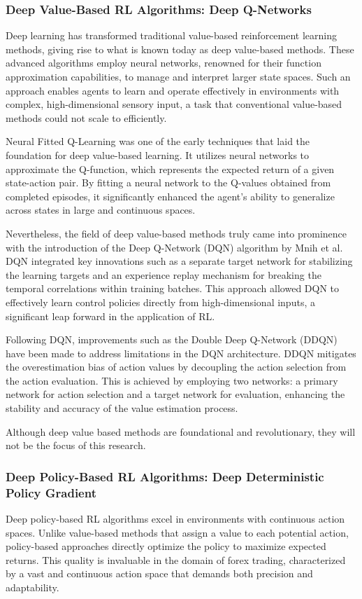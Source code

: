 \subsubsection{Deep Value-Based RL Algorithms: Deep Q-Networks}
Deep learning has transformed traditional value-based reinforcement learning methods, giving rise to what is known today as deep value-based methods. These advanced algorithms employ neural networks, renowned for their function approximation capabilities, to manage and interpret larger state spaces. Such an approach enables agents to learn and operate effectively in environments with complex, high-dimensional sensory input, a task that conventional value-based methods could not scale to efficiently.

Neural Fitted Q-Learning was one of the early techniques that laid the foundation for deep value-based learning. It utilizes neural networks to approximate the Q-function, which represents the expected return of a given state-action pair. By fitting a neural network to the Q-values obtained from completed episodes, it significantly enhanced the agent's ability to generalize across states in large and continuous spaces.

Nevertheless, the field of deep value-based methods truly came into prominence with the introduction of the Deep Q-Network (DQN) algorithm by Mnih et al. DQN integrated key innovations such as a separate target network for stabilizing the learning targets and an experience replay mechanism for breaking the temporal correlations within training batches. This approach allowed DQN to effectively learn control policies directly from high-dimensional inputs, a significant leap forward in the application of RL.

Following DQN, improvements such as the Double Deep Q-Network (DDQN) have been made to address limitations in the DQN architecture. DDQN mitigates the overestimation bias of action values by decoupling the action selection from the action evaluation. This is achieved by employing two networks: a primary network for action selection and a target network for evaluation, enhancing the stability and accuracy of the value estimation process.

Although deep value based methods are foundational and revolutionary, they will not be the focus of this research.

\subsubsection{Deep Policy-Based RL Algorithms: Deep Deterministic Policy Gradient}
Deep policy-based RL algorithms excel in environments with continuous action spaces. Unlike value-based methods that assign a value to each potential action, policy-based approaches directly optimize the policy to maximize expected returns. This quality is invaluable in the domain of forex trading, characterized by a vast and continuous action space that demands both precision and adaptability.

